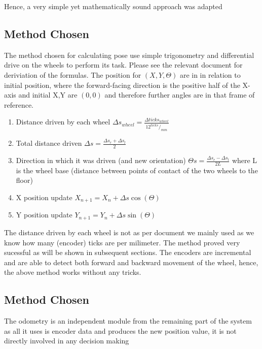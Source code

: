 \documentclass[11pt, a4paper]{article}
\begin{document}
Hence, a very simple yet mathematically sound approach \cite{odo_used} was adapted 



\subsection{Method Chosen}

The method chosen for calculating pose\cite{odo_used} use simple trigonometry and differential drive on 
the wheels to perform its task. Please see the relevant document for deriviation of the formulas. The position for 
${(X,Y,\Theta)}$ are in in relation to initial position, where the forward-facing direction is the positive half of the
X-axis and initial X,Y are ${(0,0)}$ and therefore further angles are in that frame of reference.

\begin{enumerate}

	\item Distance driven by each wheel $\Delta s_{wheel} = \frac {\Delta ticks_{wheel} } {12 ^{ticks}/_{mm}} $
	\item Total distance driven $ \Delta s = \frac{\Delta s_{r} + \Delta s_{l} }{2}$
	\item Direction in which it was driven (and new orientation) $\Theta s = \frac{ \Delta s_{r} - \Delta s_{l} }{2L}$ where L is the wheel base 
	(distance between points of contact of the two wheels to the floor)
	\item X position update $X_{n+1} = X_{n} + \Delta s \cos (\Theta)$
	\item Y position update $Y_{n+1} = Y_{n} + \Delta s \sin (\Theta)$


\end{enumerate}


The distance driven by each wheel is not as per document we mainly used as we know 
how many (encoder) ticks are per milimeter. The method proved very sucessful as 
will be shown in subsequent sections. The encoders are incremental and are able to 
detect both forward and backward movement of the wheel, hence, the above method works 
without any tricks.

\subsection{Method Chosen}

The odometry is an independent module from the remaining part of the system as 
all it uses is encoder data and produces the new position value, it is not directly
involved in any decision making
\end{document}
